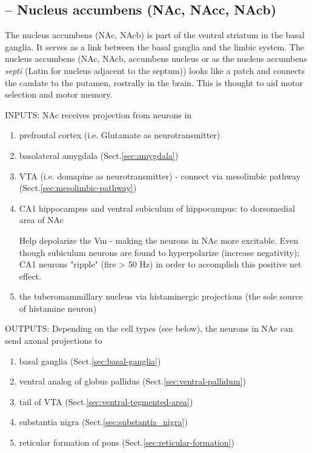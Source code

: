 
\subsection{-- Nucleus accumbens (NAc, NAcc, NAcb)}
\label{sec:nucleus_accumbens}

The nucleus accumbens (NAc, NAcb) is part of the ventral striatum in the basal
ganglia.
It serves as a link between the basal ganglia and the limbic system.
The nucleus accumbens (NAc, NAcb,  accumbens nucleus or as the nucleus accumbens
{\it septi} (Latin for nucleus adjacent to the septum)) looks like a patch and
connects the caudate to the putamen, rostrally in the brain. This is thought to
aid motor selection and motor memory.

INPUTS: NAc receives projection from neurons in
\begin{enumerate}
  \item prefrontal cortex (i.e. Glutamate as neurotransmitter)
  \item basolateral amygdala (Sect.\ref{sec:amygdala})
  \item VTA (i.e. domapine as neurotransmitter) - connect via mesolimbic pathway
  (Sect.\ref{sec:mesolimbic-pathway})

  \item CA1 hippocampus and ventral subiculum of hippocampus: to dorsomedial
  area of NAc

Help depolarize the Vm - making the neurons in NAc more excitable.
Even though subiculum neurons are found to hyperpolarize (increase negativity);
CA1 neurons "ripple" (fire > 50 Hz) in order to accomplish this positive net
effect.

  \item the tuberomammillary nucleus via histaminergic projections (the sole
  source of histamine neuron)
\end{enumerate}

OUTPUTS: Depending on the cell types (see below), the neurons in NAc can send
axonal projections to
\begin{enumerate}
  \item basal ganglia  (Sect.\ref{sec:basal-ganglia})
  \item ventral analog of globus pallidus (Sect.\ref{sec:ventral-pallidum})
  \item tail of VTA (Sect.\ref{sec:ventral-tegmented-area})
  \item substantia nigra (Sect.\ref{sec:substantia_nigra})
  \item reticular formation of pons (Sect.\ref{sec:reticular-formation})
\end{enumerate}

